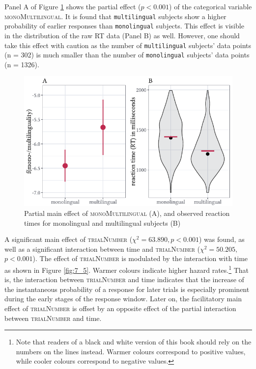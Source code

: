 Panel A of Figure \ref{fig:7_4} shows the partial effect ($p<0.001$) of the categorical variable \textsc{monoMultilingual}. It is found that \texttt{multilingual} subjects show a higher probability of earlier responses than \texttt{monolingual} subjects. This effect is visible in the distribution of the raw RT data (Panel B) as well. However, one should take this effect with caution as the number of \texttt{multilingual} subjects’ data points (n = 302) is much smaller than the number of \texttt{monolingual} subjects’ data points (n = 1326). 

\begin{figure}
    \centering
    \includegraphics[]{figures/fig7.4.pdf}
    \caption{Partial main effect of \textsc{monoMultilingual} (A), and observed reaction times for monolingual and multilingual subjects (B)}
    \label{fig:7_4}
\end{figure}

A significant main effect of \textsc{trialNumber} ($χ^{2}=63.890, p<0.001$) was found, as well as a significant interaction between time and \textsc{trialNumber} ($χ^{2}=50.205,$ $p<0.001$). The effect of \textsc{trialNumber} is modulated by the interaction with time as shown in Figure \ref{fig:7_5}. Warmer colours indicate higher hazard rates.\footnote{Note that readers of a black and white version of this book should rely on the numbers on the lines instead. Warmer colours correspond to positive values, while cooler colours correspond to negative values.} That is, the interaction between \textsc{trialNumber} and time indicates that the increase of the instantaneous probability of a response for later trials is especially prominent during the early stages of the response window. Later on, the facilitatory main effect of \textsc{trialNumber} is offset by an opposite effect of the partial interaction between \textsc{trialNumber} and time.

